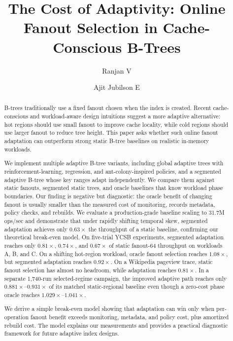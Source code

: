\documentclass[sigconf,screen]{acmart}
\begin{document}
\title{The Cost of Adaptivity: Online Fanout Selection in Cache-Conscious B-Trees}

\author{Ranjan V}

\author{Ajit Jubilson E}

\begin{abstract}
B-trees traditionally use a fixed fanout chosen when the index is created.
Recent cache-conscious and workload-aware design intuitions suggest a more
adaptive alternative: hot regions should use small fanout to improve cache
locality, while cold regions should use larger fanout to reduce tree height.
This paper asks whether such online fanout adaptation can outperform strong
static B-tree baselines on realistic in-memory workloads.

We implement multiple adaptive B-tree variants, including global adaptive
trees with reinforcement-learning, regression, and ant-colony-inspired
policies, and a segmented adaptive B-tree whose key ranges adapt independently.
We compare them against static fanouts, segmented static trees, and oracle
baselines that know workload phase boundaries.  Our finding is negative but
diagnostic: the oracle benefit of changing fanout is usually smaller than the
measured cost of monitoring, records metadata, policy checks, and rebuilds.
We evaluate a production-grade baseline scaling to 31.7M ops/sec and
demonstrate that under rapidly shifting temporal skew, segmented adaptation
achieves only \(0.63\times\) the throughput of a static baseline, confirming
our theoretical break-even model.
On five-trial YCSB experiments, segmented adaptation reaches only
\(0.81\times\), \(0.74\times\), and \(0.67\times\) of static fanout-64
throughput on workloads A, B, and C.  On a shifting hot-region workload,
oracle fanout selection reaches \(1.08\times\), but segmented adaptation
reaches \(0.92\times\).  On a Wikipedia pageview trace, static fanout
selection has almost no headroom, while adaptation reaches \(0.81\times\).
In a separate 1,740-run selected-regime campaign, the improved adaptive path
reaches only \(0.881\times\)--\(0.931\times\) of its matched static-regional
baseline even though a zero-cost phase oracle reaches
\(1.029\times\)--\(1.041\times\).

We derive a simple break-even model showing that adaptation can win only when
per-operation fanout benefit exceeds monitoring, metadata, and policy cost,
plus amortized rebuild cost.  The model explains our measurements and provides
a practical diagnostic framework for future adaptive index designs.
\end{abstract}
\end{document}
